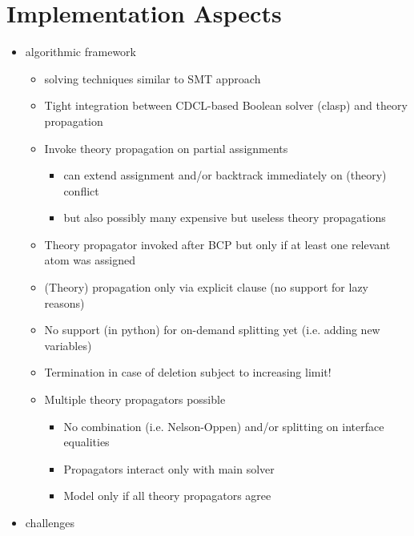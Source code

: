 \section{Implementation Aspects}
\begin{itemize}
\item algorithmic framework
  \begin{itemize}
    \item solving techniques similar to SMT approach
    \item Tight integration between CDCL-based Boolean solver (clasp) and theory propagation
    \item Invoke theory propagation on partial assignments
    \begin{itemize}
      \item can extend assignment and/or backtrack immediately on (theory) conflict
      \item but also possibly many expensive but useless theory propagations
    \end{itemize}
    \item Theory propagator invoked after BCP but only if at least one relevant atom was assigned
    \item (Theory) propagation only via explicit clause (no support for lazy reasons)
    \item No support (in python) for on-demand splitting yet (i.e. adding new variables)
    \item Termination in case of deletion subject to increasing limit!
    \item Multiple theory propagators possible
    \begin{itemize}
     \item No combination (i.e. Nelson-Oppen) and/or splitting on interface equalities
     \item Propagators interact only with main solver
     \item Model only if all theory propagators agree
    \end{itemize}

  \end{itemize}
\item challenges
\end{itemize}


